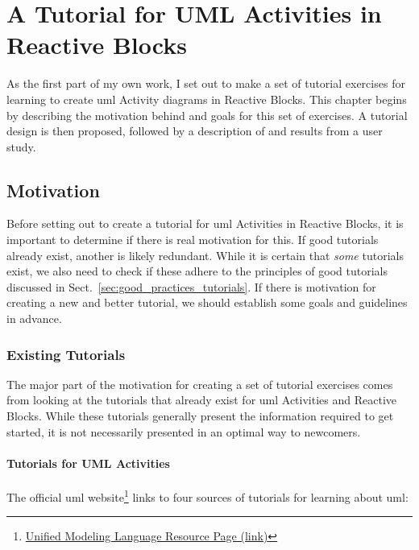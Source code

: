\chapter{A Tutorial for UML Activities in Reactive Blocks}
\label{ch:reactive_blocks_tutorial}
As the first part of my own work, I set out to make a set of tutorial exercises for learning to create \gls{uml} Activity diagrams in Reactive Blocks. This chapter begins by describing the motivation behind and goals for this set of exercises. A tutorial design is then proposed, followed by a description of and results from a user study.

\section{Motivation}
\label{sec:tutorial_motivation}
Before setting out to create a tutorial for \gls{uml} Activities in Reactive Blocks, it is important to determine if there is real motivation for this. If good tutorials already exist, another is likely redundant. While it is certain that \emph{some} tutorials exist, we also need to check if these adhere to the principles of good tutorials discussed in Sect.~\ref{sec:good_practices_tutorials}. If there is motivation for creating a new and better tutorial, we should establish some goals and guidelines in advance.

\subsection{Existing Tutorials}
\label{sec:existing_tutorials}
The major part of the motivation for creating a set of tutorial exercises comes from looking at the tutorials that already exist for \gls{uml} Activities and Reactive Blocks. While these tutorials generally present the information required to get started, it is not necessarily presented in an optimal way to newcomers.

\subsubsection{Tutorials for UML Activities}
The official \gls{uml} website\footnote{\href{http://www.uml.org/\#Links-Tutorials}{Unified Modeling Language Resource Page (link)}} links to four sources of tutorials for learning about \gls{uml}:

